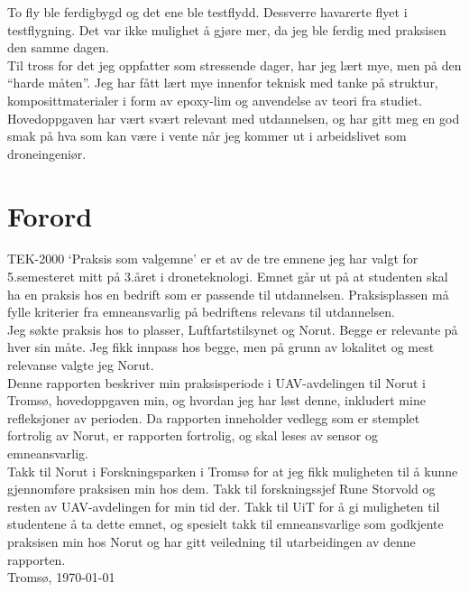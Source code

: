 \documentclass[12pt, a4paper]{article}
\begin{document}
To fly ble ferdigbygd og det ene ble testflydd. Dessverre havarerte flyet i testflygning. Det var ikke mulighet å gjøre mer, da jeg ble ferdig med praksisen den samme dagen. \\

Til tross for det jeg oppfatter som stressende dager, har jeg lært mye, men på den ``harde måten''. Jeg har fått lært mye innenfor teknisk med tanke på struktur, komposittmaterialer i form av epoxy-lim og anvendelse av teori fra studiet. Hovedoppgaven har vært svært relevant med utdannelsen, og har gitt meg en god smak på hva som kan være i vente når jeg kommer ut i arbeidslivet som droneingeniør. \\

\newpage

\section{Forord}
TEK-2000 `Praksis som valgemne' er et av de tre emnene jeg har valgt for 5.semesteret mitt på 3.året i droneteknologi. Emnet går ut på at studenten skal ha en praksis hos en bedrift som er passende til utdannelsen. Praksisplassen må fylle kriterier fra emneansvarlig på bedriftens relevans til utdannelsen. \\

Jeg søkte praksis hos to plasser, Luftfartstilsynet og Norut. Begge er relevante på hver sin måte. Jeg fikk innpass hos begge, men på grunn av lokalitet og mest relevanse valgte jeg Norut.\\

Denne rapporten beskriver min praksisperiode i UAV-avdelingen til Norut i Tromsø, hovedoppgaven min, og hvordan jeg har løst denne, inkludert mine refleksjoner av perioden. Da rapporten inneholder vedlegg som er stemplet fortrolig av Norut, er rapporten fortrolig, og skal leses av sensor og emneansvarlig. \\ 

Takk til Norut i Forskningsparken i Tromsø for at jeg fikk muligheten til å kunne gjennomføre praksisen min hos dem. Takk til forskningssjef Rune Storvold og resten av UAV-avdelingen for min tid der. Takk til UiT for å gi muligheten til studentene å ta dette emnet, og spesielt takk til emneansvarlige som godkjente praksisen min hos Norut og har gitt veiledning til utarbeidingen av denne rapporten. \\[7cm]
Tromsø, \today \\[.5cm]
\end{document}
